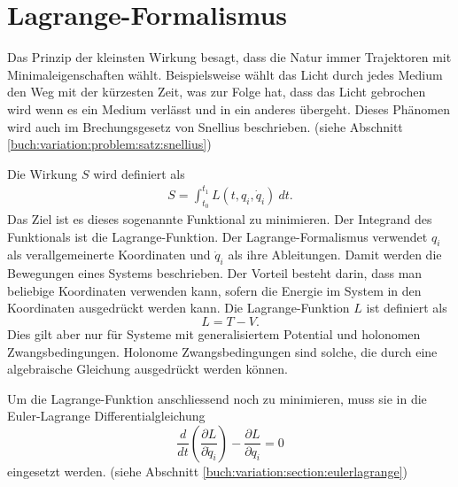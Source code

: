 \section{Lagrange-Formalismus}
Das Prinzip der kleinsten Wirkung besagt, dass die Natur immer Trajektoren
mit Minimaleigenschaften wählt.
Beispielsweise wählt das Licht durch jedes Medium den Weg mit der kürzesten Zeit, was zur Folge hat,
dass das Licht gebrochen wird wenn es ein Medium verlässt und in ein anderes übergeht.
Dieses Phänomen wird auch im Brechungsgesetz von Snellius beschrieben.
(siehe Abschnitt \ref{buch:variation:problem:satz:snellius})

Die Wirkung \(S\) wird definiert als
\begin{align*}
    S = \int_{t_0}^{t_1} L(t,q_i,\dot{q}_i) \: dt.
\end{align*}
Das Ziel ist es dieses sogenannte Funktional zu minimieren.
Der Integrand des Funktionals ist die Lagrange-Funktion.
Der Lagrange-Formalismus verwendet \(q_i\) als verallgemeinerte Koordinaten
und \(\dot{q}_i\) als ihre Ableitungen.
Damit werden die Bewegungen eines Systems beschrieben.
Der Vorteil besteht darin, dass man beliebige Koordinaten verwenden kann,
sofern die Energie im System in den Koordinaten ausgedrückt werden kann.
Die Lagrange-Funktion \(L\) ist definiert als
\begin{equation}
    L = T - V.
    \label{eq:lagrange} 
\end{equation}
Dies gilt aber nur für Systeme mit generalisiertem Potential und holonomen Zwangsbedingungen.
Holonome Zwangsbedingungen sind solche, die durch eine algebraische Gleichung
ausgedrückt werden können.%

Um die Lagrange-Funktion anschliessend noch zu minimieren, muss sie in die
Euler-Lagrange Differentialgleichung
\begin{equation*}
    \frac{d}{dt} \left( \frac{\partial L}{\partial \dot{q}_i} \right) 
    - \frac{\partial L}{\partial q_i} = 0
\end{equation*}
eingesetzt werden.
(siehe Abschnitt \ref{buch:variation:section:eulerlagrange})




